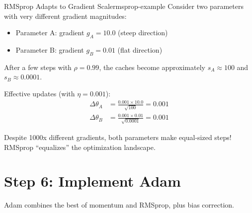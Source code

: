 \documentclass[../../main.tex]{subfiles}
\begin{document}
\begin{example}{RMSprop Adapts to Gradient Scale}{rmsprop-example}
Consider two parameters with very different gradient magnitudes:
\begin{itemize}
    \item Parameter A: gradient $g_A = 10.0$ (steep direction)
    \item Parameter B: gradient $g_B = 0.01$ (flat direction)
\end{itemize}

After a few steps with $\rho = 0.99$, the caches become approximately $s_A \approx 100$ and $s_B \approx 0.0001$.

Effective updates (with $\eta = 0.001$):
\begin{align*}
    \Delta \theta_A &= \frac{0.001 \times 10.0}{\sqrt{100}} = 0.001 \\
    \Delta \theta_B &= \frac{0.001 \times 0.01}{\sqrt{0.0001}} = 0.001
\end{align*}

Despite 1000x different gradients, both parameters make equal-sized steps! RMSprop ``equalizes'' the optimization landscape.
\end{example}

\section{Step 6: Implement Adam}
\label{sec:capstone-adam}

Adam combines the best of momentum and RMSprop, plus bias correction.
\end{document}
